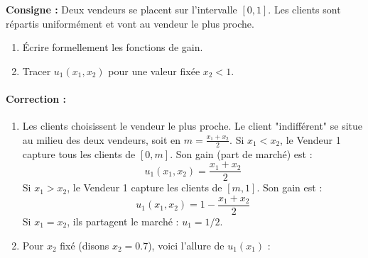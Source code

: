\begin{exemple}
\textbf{Consigne :} Deux vendeurs se placent sur l'intervalle $[0, 1]$. Les clients sont répartis uniformément et vont au vendeur le plus proche.
\begin{enumerate}
    \item Écrire formellement les fonctions de gain.
    \item Tracer $u_1(x_1, x_2)$ pour une valeur fixée $x_2 < 1$.
\end{enumerate}

\paragraph{Correction :}
\begin{enumerate}
    \item Les clients choisissent le vendeur le plus proche. Le client "indifférent" se situe au milieu des deux vendeurs, soit en $m = \frac{x_1 + x_2}{2}$.
   Si $x_1 < x_2$, le Vendeur 1 capture tous les clients de $[0, m]$. Son gain (part de marché) est :
   $$u_1(x_1, x_2) = \frac{x_1 + x_2}{2}$$
   Si $x_1 > x_2$, le Vendeur 1 capture les clients de $[m, 1]$. Son gain est :
   $$u_1(x_1, x_2) = 1 - \frac{x_1 + x_2}{2}$$
   Si $x_1 = x_2$, ils partagent le marché : $u_1 = 1/2$.

    \item Pour $x_2$ fixé (disons $x_2 = 0.7$), voici l'allure de $u_1(x_1)$ :
\begin{center}
\end{center}
\end{enumerate}
\end{exemple}
